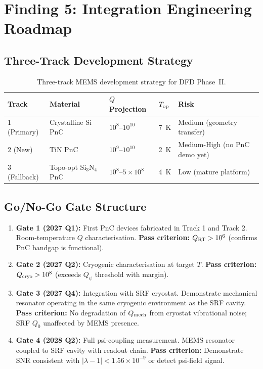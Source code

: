 \documentclass[11pt]{article}
\theoremstyle{definition}
\theoremstyle{remark}
\newcommand{\ee}[1]{\times 10^{#1}}
\newcommand{\Qpsi}{Q_\psi}
\newcommand{\SNR}{\mathrm{SNR}}
\begin{document}
\section{Finding 5: Integration Engineering Roadmap}
\label{sec:roadmap}

\subsection{Three-Track Development Strategy}

\begin{table}[H]
\centering
\caption{Three-track MEMS development strategy for DFD Phase~II.}
\renewcommand{\arraystretch}{1.3}
\begin{tabular}{p{2.5cm}p{3cm}p{2.5cm}p{2cm}p{2.5cm}}
\toprule
\textbf{Track} & \textbf{Material} & \textbf{$Q$ Projection} &
\textbf{$T_{\rm op}$} & \textbf{Risk} \\
\midrule
1 (Primary) & Crystalline Si PnC & $10^8$--$10^{10}$ & 7~K &
Medium (geometry transfer) \\
\midrule
2 (New) & TiN PnC & $10^9$--$10^{10}$ & 2~K &
Medium-High (no PnC demo yet) \\
\midrule
3 (Fallback) & Topo-opt Si$_3$N$_4$ PnC & $10^8$--$5\ee{8}$ & 4~K &
Low (mature platform) \\
\bottomrule
\end{tabular}
\end{table}

\subsection{Go/No-Go Gate Structure}

\begin{enumerate}[nosep]
\item \textbf{Gate 1 (2027 Q1):} First PnC devices fabricated in
  Track 1 and Track 2. Room-temperature $Q$ characterisation.
  \textbf{Pass criterion:} $Q_{\rm RT} > 10^6$ (confirms PnC
  bandgap is functional).

\item \textbf{Gate 2 (2027 Q2):} Cryogenic characterisation at
  target $T$.
  \textbf{Pass criterion:} $Q_{\rm cryo} > 10^8$ (exceeds $\Qpsi$
  threshold with margin).

\item \textbf{Gate 3 (2027 Q4):} Integration with SRF cryostat.
  Demonstrate mechanical resonator operating in the same cryogenic
  environment as the SRF cavity.
  \textbf{Pass criterion:} No degradation of $Q_{\rm mech}$ from
  cryostat vibrational noise; SRF $Q_0$ unaffected by MEMS
  presence.

\item \textbf{Gate 4 (2028 Q2):} Full psi-coupling measurement.
  MEMS resonator coupled to SRF cavity with readout chain.
  \textbf{Pass criterion:} Demonstrate $\SNR$ consistent with
  $|\lambda - 1| < 1.56\ee{-9}$ or detect psi-field signal.
\end{enumerate}
\end{document}
